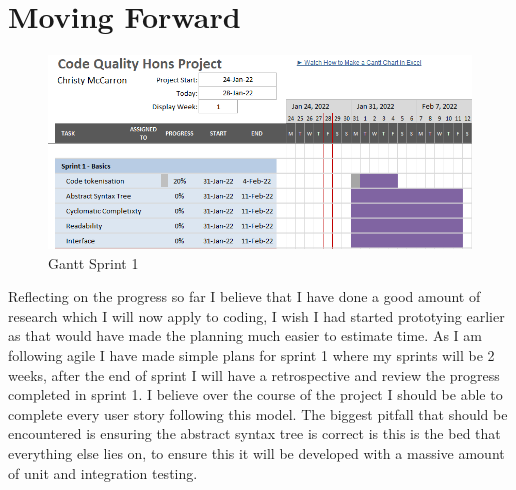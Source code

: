 \section{Moving Forward}
\begin{figure}
    \includegraphics[width=.2\textwidth]{images/gantt.png}
    \caption{Gantt Sprint 1}
    \label{fig:gantt}
  \end{figure}
  Reflecting on the progress so far I believe that I have done a good amount of research which I will now apply to coding, I wish I had started prototying earlier as that would have made the planning much easier to estimate time.
  \newline
  As I am following agile I have made simple plans for sprint 1 where my sprints will be 2 weeks, after the end of sprint I will have a retrospective and review the progress completed in sprint 1.
  \newline
  I believe over the course of the project I should be able to complete every user story following this model.
  \newline
  The biggest pitfall that should be encountered is ensuring the abstract syntax tree is correct is this is the bed that everything else lies on, to ensure this it will be developed with a massive amount of unit and integration testing.